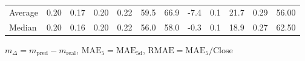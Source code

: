 \begin{threeparttable}
{\begin{tabular}{lrrrrrrrrrrr}
Average &          0.20 &          0.17 &          0.20 &        0.22 &                59.5 &                66.9 &       -7.4 &                 0.1 &             21.7 &            0.29 &                  56.00 \\
 Median &          0.20 &          0.16 &          0.20 &        0.22 &                56.0 &                58.0 &       -0.3 &                 0.1 &             18.9 &            0.27 &                  62.50 \\
\bottomrule
\end{tabular}
}
\begin{tablenotes}\footnotesize
\item $m_\Delta=m_{\text{pred}}-m_{\text{real}}$,
$\mathrm{MAE}_5=\mathrm{MAE}_{5\text{d}}$,
$\mathrm{RMAE}=\mathrm{MAE}_5/\text{Close}$
\end{tablenotes}
\end{threeparttable}
\endgroup

